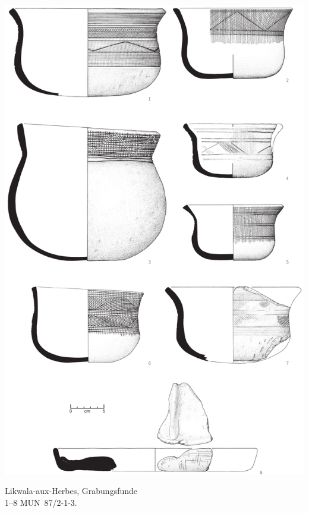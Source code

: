 \begin{pl}[H]
	\includegraphics{plt/Taf93.pdf}
	\vspace{.75em}\caption{Likwala-aux-Herbes, Grabungsfunde \\ 1--8 MUN~87/2-1-3.}
	\label{pl:93}
\end{pl}

